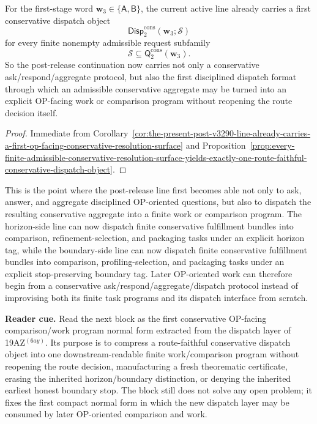 \begin{corollary}
\label{cor:the-present-post-v3290-line-already-carries-a-first-conservative-dispatch-object}
For the first-stage word \(\mathbf w_3\in\{\mathsf A,\mathsf B\}\), the current active line already carries a first conservative dispatch object
\[
  \mathsf{Disp}^{\mathrm{cons}}_{2}(\mathbf w_3;\mathcal S)
\]
for every finite nonempty admissible request subfamily
\[
  \mathcal S\subseteq \mathsf{Q}^{\mathrm{cons}}_{2}(\mathbf w_3).
\]
So the post-release continuation now carries not only a conservative ask/respond/aggregate protocol, but also the first disciplined dispatch format through which an admissible conservative aggregate may be turned into an explicit OP-facing work or comparison program without reopening the route decision itself.
\end{corollary}

\begin{proof}
Immediate from Corollary~\ref{cor:the-present-post-v3290-line-already-carries-a-first-op-facing-conservative-resolution-surface} and Proposition~\ref{prop:every-finite-admissible-conservative-resolution-surface-yields-exactly-one-route-faithful-conservative-dispatch-object}.
\end{proof}

\begin{remark}
\label{rem:what-the-first-conservative-resolution-to-task-dispatch-layer-now-buys}
This is the point where the post-release line first becomes able not only to ask, answer, and aggregate disciplined OP-oriented questions, but also to dispatch the resulting conservative aggregate into a finite work or comparison program. The horizon-side line can now dispatch finite conservative fulfillment bundles into comparison, refinement-selection, and packaging tasks under an explicit horizon tag, while the boundary-side line can now dispatch finite conservative fulfillment bundles into comparison, profiling-selection, and packaging tasks under an explicit stop-preserving boundary tag. Later OP-oriented work can therefore begin from a conservative ask/respond/aggregate/dispatch protocol instead of improvising both its finite task programs and its dispatch interface from scratch.
\end{remark}


\noindent\textbf{Reader cue.} Read the next block as the first conservative OP-facing comparison/work program normal form extracted from the dispatch layer of 19AZ$^{(6ay)}$. Its purpose is to compress a route-faithful conservative dispatch object into one downstream-readable finite work/comparison program without reopening the route decision, manufacturing a fresh theorematic certificate, erasing the inherited horizon/boundary distinction, or denying the inherited earliest honest boundary stop. The block still does not solve any open problem; it fixes the first compact normal form in which the new dispatch layer may be consumed by later OP-oriented comparison and work.

